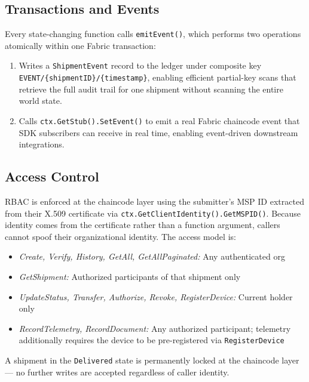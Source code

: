 \documentclass[conference]{IEEEtran}
\begin{document}
\subsection{Transactions and Events}

Every state-changing function calls \texttt{emitEvent()}, which performs two
operations atomically within one Fabric transaction:

\begin{enumerate}
  \item Writes a \texttt{ShipmentEvent} record to the ledger under composite
    key \texttt{EVENT/\{shipmentID\}/\{timestamp\}}, enabling efficient
    partial-key scans that retrieve the full audit trail for one shipment
    without scanning the entire world state.
  \item Calls \texttt{ctx.GetStub().SetEvent()} to emit a real Fabric
    chaincode event that SDK subscribers can receive in real time, enabling
    event-driven downstream integrations.
\end{enumerate}

\subsection{Access Control}

RBAC is enforced at the chaincode layer using the submitter's MSP ID
extracted from their X.509 certificate via
\texttt{ctx.GetClientIdentity().GetMSPID()}.  Because identity comes from
the certificate rather than a function argument, callers cannot spoof their
organizational identity.  The access model is:

\begin{itemize}
  \item \textit{Create, Verify, History, GetAll, GetAllPaginated:} Any authenticated org
  \item \textit{GetShipment:} Authorized participants of that shipment only
  \item \textit{UpdateStatus, Transfer, Authorize, Revoke, RegisterDevice:} Current holder only
  \item \textit{RecordTelemetry, RecordDocument:} Any authorized participant; telemetry additionally requires the device to be pre-registered via \texttt{RegisterDevice}
\end{itemize}

A shipment in the \texttt{Delivered} state is permanently locked at the
chaincode layer --- no further writes are accepted regardless of caller
identity.
\end{document}
